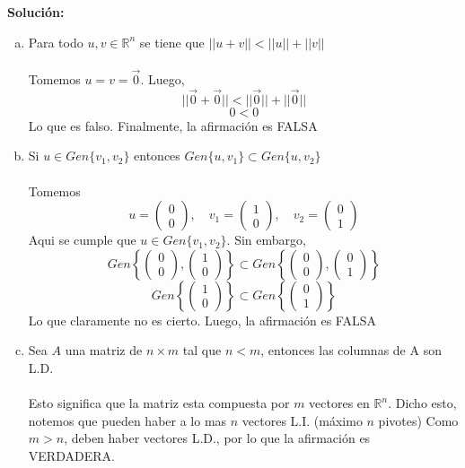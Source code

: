 \documentclass[12pt]{article}
\newenvironment{solucion}
{\begin{mdframed}[backgroundcolor=black!10]
		{\bf Solución:}\\
	}
	{
	\end{mdframed}
}
\newenvironment{preguntas}
{\begin{enumerate}\itemsep12pt
	}
	{
	\end{enumerate}
}
\newcommand{\R}{\mathbb{R}}
\begin{document}
\begin{preguntas}
\begin{solucion}
\begin{enumerate}[a)]
\item Para todo $u, v \in \R^n$ se tiene que $||u+v|| < ||u||+||v||$\\\\
			Tomemos $u = v = \vec{0}$. Luego,
			$$||\vec{0} + \vec{0}|| < ||\vec{0}|| + ||\vec{0}||$$
			$$0 < 0$$
			Lo que es falso. Finalmente, la afirmación es FALSA
\item Si $u \in Gen\{v_1, v_2\}$ entonces $Gen\{u, v_1\} \subset Gen\{u, v_2\}$\\\\
			Tomemos
			$$u = \begin{pmatrix}
			0 \\ 0 
			\end{pmatrix}, \quad v_1 = \begin{pmatrix}
			1 \\ 0 
			\end{pmatrix}, \quad v_2 = \begin{pmatrix}
			0 \\ 1
			\end{pmatrix}$$
			Aqui se cumple que $u \in Gen\{v_1, v_2\}$. Sin embargo,
			$$Gen\left\{\begin{pmatrix}
			0 \\ 0 
			\end{pmatrix}, \begin{pmatrix}
			1 \\ 0 
			\end{pmatrix}\right\} \subset Gen\left\{\begin{pmatrix}
			0 \\ 0 
			\end{pmatrix}, \begin{pmatrix}
			0 \\ 1
			\end{pmatrix}\right\}$$
			$$Gen\left\{\begin{pmatrix}
			1 \\ 0 
			\end{pmatrix}\right\} \subset Gen\left\{\begin{pmatrix}
			0 \\ 1
			\end{pmatrix}\right\}$$
			Lo que claramente no es cierto. Luego, la afirmación es FALSA
\item Sea $A$ una matriz de $n \times m$ tal que $n < m $, entonces las columnas de A son L.D.\\\\
			Esto significa que la matriz esta compuesta por $m$ vectores en $\R^n$. Dicho esto, notemos que pueden haber a lo mas $n$ vectores L.I. (máximo $n$ pivotes) Como $m>n$, deben haber vectores L.D., por lo que la afirmación es VERDADERA.

\end{enumerate}
\end{solucion}
\end{preguntas}
\end{document}
